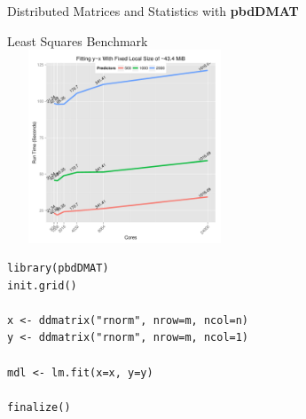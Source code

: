 \begin{frame}[fragile]
  \begin{block}{Distributed Matrices and Statistics with \textbf{pbdDMAT}}\pause
  \begin{center}
  \begin{minipage}{.485\textwidth}
  \centering\vspace{-.1cm}
	Least Squares Benchmark\\
		\includegraphics[width=7cm,height=5.75cm]{../common/pics/benchmarks/lmfit2}
  \end{minipage}
 \begin{minipage}{.485\textwidth}
 \vspace{-.36cm}
 \centering
\begin{lstlisting}[title=\ ,basicstyle=\scriptsize,numbers=none]
library(pbdDMAT)
init.grid()

x <- ddmatrix("rnorm", nrow=m, ncol=n)
y <- ddmatrix("rnorm", nrow=m, ncol=1)

mdl <- lm.fit(x=x, y=y)

finalize()
\end{lstlisting}
 \end{minipage}
 \end{center}
  \end{block}
\end{frame}


